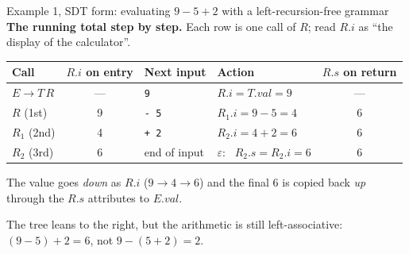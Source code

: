 \documentclass[11pt,a4paper]{article}
\begin{document}
\begin{examplebox}{Example 1, SDT form: evaluating $9-5+2$ with a left-recursion-free grammar}
\textbf{The running total step by step.} Each row is one call of $R$; read $R.i$ as ``the display of the calculator''.
\begin{center}
\small
\begin{tabular}{@{}l c l l c@{}}
\toprule
\textbf{Call} & $R.i$ \textbf{on entry} & \textbf{Next input} & \textbf{Action} & $R.s$ \textbf{on return} \\ \midrule
$E\to T\,R$ & --- & \texttt{9} & $R.i = T.val = 9$ & --- \\
$R$ (1st) & 9 & \texttt{- 5} & $R_1.i = 9-5 = 4$ & 6 \\
$R_1$ (2nd) & 4 & \texttt{+ 2} & $R_2.i = 4+2 = 6$ & 6 \\
$R_2$ (3rd) & 6 & end of input & $\varepsilon$: \ $R_2.s = R_2.i = 6$ & 6 \\ \bottomrule
\end{tabular}
\end{center}
The value goes \emph{down} as $R.i$ ($9\to4\to6$) and the final $6$ is copied back \emph{up} through the $R.s$ attributes to $E.val$.

The tree leans to the right, but the arithmetic is still left-associative: $(9-5)+2=6$, not $9-(5+2)=2$.
\end{examplebox}
\end{document}
